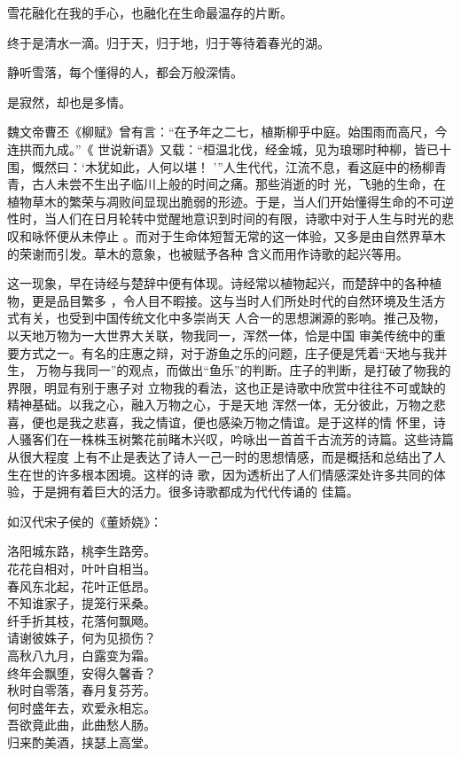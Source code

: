 \documentclass[12pt,a4paper]{article}
\begin{document}
		雪花融化在我的手心，也融化在生命最温存的片断。\par
		终于是清水一滴。归于天，归于地，归于等待着春光的湖。

		静听雪落，每个懂得的人，都会万般深情。

	\endwriting



		是寂然，却也是多情。

		魏文帝曹丕《柳赋》曾有言：“在予年之二七，植斯柳乎中庭。始围雨而高尺，今连拱而九成。”《
	世说新语》又载：“桓温北伐，经金城，见为琅琊时种柳，皆已十围，慨然曰：‘木犹如此，人何以堪！
	’”人生代代，江流不息，看这庭中的杨柳青青，古人未尝不生出子临川上般的时间之痛。那些消逝的时
	光，飞驰的生命，在植物草木的繁荣与凋败间显现出脆弱的形迹。于是，当人们开始懂得生命的不可逆
	性时，当人们在日月轮转中觉醒地意识到时间的有限，诗歌中对于人生与时光的悲叹和咏怀便从未停止
	。而对于生命体短暂无常的这一体验，又多是由自然界草木的荣谢而引发。草木的意象，也被赋予各种
	含义而用作诗歌的起兴等用。

		这一现象，早在诗经与楚辞中便有体现。诗经常以植物起兴，而楚辞中的各种植物，更是品目繁多
	，令人目不暇接。这与当时人们所处时代的自然环境及生活方式有关，也受到中国传统文化中多崇尚天
	人合一的思想渊源的影响。推己及物，以天地万物为一大世界大关联，物我同一，浑然一体，恰是中国
	审美传统中的重要方式之一。有名的庄惠之辩，对于游鱼之乐的问题，庄子便是凭着“天地与我并生，
	万物与我同一”的观点，而做出“鱼乐”的判断。庄子的判断，是打破了物我的界限，明显有别于惠子对
	立物我的看法，这也正是诗歌中欣赏中往往不可或缺的精神基础。以我之心，融入万物之心，于是天地
	浑然一体，无分彼此，万物之悲喜，便也是我之悲喜，我之情谊，便也感染万物之情谊。是于这样的情
	怀里，诗人骚客们在一株株玉树繁花前睹木兴叹，吟咏出一首首千古流芳的诗篇。这些诗篇从很大程度
	上有不止是表达了诗人一己一时的思想情感，而是概括和总结出了人生在世的许多根本困境。这样的诗
	歌，因为透析出了人们情感深处许多共同的体验，于是拥有着巨大的活力。很多诗歌都成为代代传诵的
	佳篇。

		如汉代宋子侯的《董娇娆》：

		\shortpoem{}{}{}
		洛阳城东路，桃李生路旁。\\
		花花自相对，叶叶自相当。\\
		春风东北起，花叶正低昂。\\
		不知谁家子，提笼行采桑。\\
		纤手折其枝，花落何飘飏。\\
		请谢彼姝子，何为见损伤？\\
		高秋八九月，白露变为霜。\\
		终年会飘堕，安得久馨香？\\
		秋时自零落，春月复芬芳。\\
		何时盛年去，欢爱永相忘。\\
		吾欲竟此曲，此曲愁人肠。\\
		归来酌美酒，挟瑟上高堂。\\
		\endshortpoem
\end{document}
